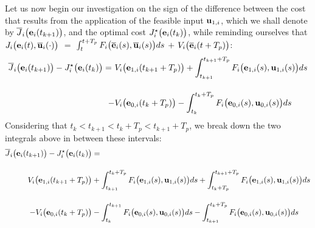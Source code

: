 Let us now begin our investigation on the sign of the difference between the cost
that results from the application of the feasible input $\bm{\mathbf{u}}_{1,i}$,
which we shall denote by $\overline{J}_i\big(\bm{\mathbf{e}}_i(t_{k+1})\big)$,
and the optimal cost $J_i^{\star}\big(\bm{\mathbf{e}}_i(t_k)\big)$, while reminding
ourselves that
$J_i \big(\bm{\mathbf{e}}_i(t), \overline{\bm{\mathbf{u}}}_i (\cdot)\big)$ $=$
$\int_{t}^{t + T_p} F_i \big(\overline{\bm{\mathbf{e}}}_i(s), \overline{\bm{\mathbf{u}}}_i (s)\big) ds$ $+$
$V_i \big(\overline{\bm{\mathbf{e}}}_i (t + T_p)\big)$:
\begin{align}
  \overline{J}_i\big(\bm{\mathbf{e}}_i(t_{k+1})\big) - J_i^{\star}\big(\bm{\mathbf{e}}_i(t_k)\big) =\
   & V_i \big(\bm{\mathbf{e}}_{1,i} (t_{k+1} + T_p)\big) + \int_{t_{k+1}}^{t_{k+1} + T_p} F_i \big(\bm{\mathbf{e}}_{1,i}(s), \bm{\mathbf{u}}_{1,i} (s)\big) ds \\[2.5ex]
  -&V_i \big(\bm{\mathbf{e}}_{0,i} (t_k + T_p)\big) - \int_{t_k}^{t_k + T_p} F_i \big(\bm{\mathbf{e}}_{0,i}(s), \bm{\mathbf{u}}_{0,i} (s)\big) ds
\end{align}
Considering that $t_k < t_{k+1} < t_k + T_p < t_{k+1} + T_p$, we break down the
two integrals above in between these intervals:
\begin{align}
  \overline{J}_i\big(\bm{\mathbf{e}}_i(t_{k+1})\big) - J_i^{\star}\big(\bm{\mathbf{e}}_i(t_k)\big) &= \\[2.5ex]
    V_i \big(\bm{\mathbf{e}}_{1,i} (t_{k+1} + T_p)\big)
    &+ \int_{t_{k+1}}^{t_k + T_p} F_i \big(\bm{\mathbf{e}}_{1,i}(s), \bm{\mathbf{u}}_{1,i} (s)\big) d s
    + \int_{t_k + T_p}^{t_{k+1} + T_p} F_i \big(\bm{\mathbf{e}}_{1,i}(s), \bm{\mathbf{u}}_{1,i} (s)\big) d s \\[2.5ex]
    -V_i \big(\bm{\mathbf{e}}_{0,i} (t_k + T_p)\big)
    &- \int_{t_k}^{t_{k+1}} F_i \big(\bm{\mathbf{e}}_{0,i}(s), \bm{\mathbf{u}}_{0,i} (s)\big) d s
    - \int_{t_{k+1}}^{t_k + T_p} F_i \big(\bm{\mathbf{e}}_{0,i}(s), \bm{\mathbf{u}}_{0,i} (s)\big) d s
\label{eq:convergence_4_integrals_2}
\end{align}



